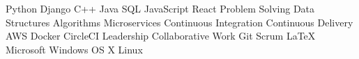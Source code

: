 
\begin{cvparagraph}

Python{\dotsep}
Django{\dotsep}
C++{\dotsep}
Java{\dotsep}
SQL{\dotsep}
JavaScript{\dotsep}
React{\dotsep}
Problem Solving{\dotsep}
Data Structures{\dotsep}
Algorithms{\dotsep}
Microservices{\dotsep}
Continuous Integration{\dotsep}
Continuous Delivery{\dotsep}
AWS{\dotsep}
Docker{\dotsep}
CircleCI{\dotsep}
Leadership{\dotsep}
Collaborative Work{\dotsep}
Git{\dotsep}
Scrum{\dotsep}
\LaTeX{\dotsep}
Microsoft Windows{\dotsep}
OS X{\dotsep}
Linux
\end{cvparagraph}
